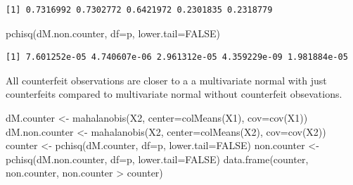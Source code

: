 \documentclass[
  letterpaper,
  DIV=11,
  numbers=noendperiod]{scrartcl}
\newenvironment{Shaded}{\begin{snugshade}}{\end{snugshade}}
\newcommand{\AttributeTok}[1]{\textcolor[rgb]{0.40,0.45,0.13}{#1}}
\newcommand{\ConstantTok}[1]{\textcolor[rgb]{0.56,0.35,0.01}{#1}}
\newcommand{\FunctionTok}[1]{\textcolor[rgb]{0.28,0.35,0.67}{#1}}
\newcommand{\NormalTok}[1]{\textcolor[rgb]{0.00,0.23,0.31}{#1}}
\newcommand{\OtherTok}[1]{\textcolor[rgb]{0.00,0.23,0.31}{#1}}
\newcommand{\SpecialCharTok}[1]{\textcolor[rgb]{0.37,0.37,0.37}{#1}}
\begin{document}
\begin{verbatim}
[1] 0.7316992 0.7302772 0.6421972 0.2301835 0.2318779
\end{verbatim}

\begin{Shaded}
\begin{Highlighting}[]
\FunctionTok{pchisq}\NormalTok{(dM.non.counter, }\AttributeTok{df=}\NormalTok{p, }\AttributeTok{lower.tail=}\ConstantTok{FALSE}\NormalTok{)}
\end{Highlighting}
\end{Shaded}

\begin{verbatim}
[1] 7.601252e-05 4.740607e-06 2.961312e-05 4.359229e-09 1.981884e-05
\end{verbatim}

All counterfeit observations are closer to a a multivariate normal with
just counterfeits compared to multivariate normal without counterfeit
obsevations.

\begin{Shaded}
\begin{Highlighting}[]
\NormalTok{dM.counter }\OtherTok{\textless{}{-}} \FunctionTok{mahalanobis}\NormalTok{(X2, }\AttributeTok{center=}\FunctionTok{colMeans}\NormalTok{(X1), }\AttributeTok{cov=}\FunctionTok{cov}\NormalTok{(X1))}
\NormalTok{dM.non.counter }\OtherTok{\textless{}{-}} \FunctionTok{mahalanobis}\NormalTok{(X2, }\AttributeTok{center=}\FunctionTok{colMeans}\NormalTok{(X2), }\AttributeTok{cov=}\FunctionTok{cov}\NormalTok{(X2))}
\NormalTok{counter }\OtherTok{\textless{}{-}} \FunctionTok{pchisq}\NormalTok{(dM.counter, }\AttributeTok{df=}\NormalTok{p, }\AttributeTok{lower.tail=}\ConstantTok{FALSE}\NormalTok{)}
\NormalTok{non.counter }\OtherTok{\textless{}{-}} \FunctionTok{pchisq}\NormalTok{(dM.non.counter, }\AttributeTok{df=}\NormalTok{p, }\AttributeTok{lower.tail=}\ConstantTok{FALSE}\NormalTok{)}
\FunctionTok{data.frame}\NormalTok{(counter, non.counter, non.counter }\SpecialCharTok{\textgreater{}}\NormalTok{ counter)}
\end{Highlighting}
\end{Shaded}
\end{document}
